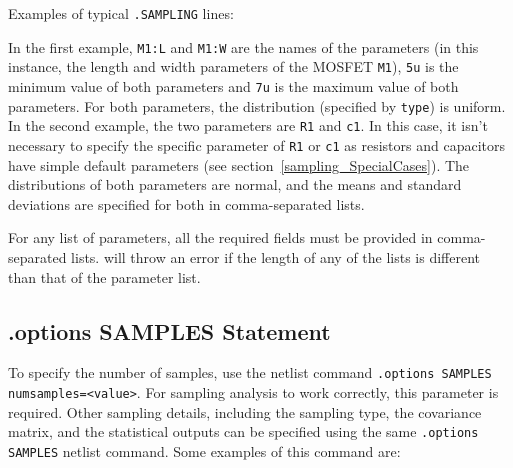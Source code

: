 Examples of typical \verb|.SAMPLING| lines:


In the first example, \verb|M1:L| and \verb|M1:W| 
are the names of the
parameters (in this instance, the length and width parameters of the MOSFET
\texttt{M1}), \verb|5u| is the minimum value of both parameters and
\verb|7u| is the maximum value of both parameters.  For both parameters, 
the distribution (specified by \texttt{type}) is uniform.
In the second example, the two parameters are \verb|R1| and \verb|c1|.   In this 
case, it isn't necessary to specify the specific parameter of \verb|R1| or \verb|c1| 
as resistors and capacitors have simple default parameters (see section~\ref{sampling_SpecialCases}).  
The distributions of both parameters are normal, and the means and standard deviations 
are specified for both in comma-separated lists.

For any list of parameters, all the required fields must be provided in comma-separated 
lists.  \Xyce{} will throw an error if the length of any of the lists is different 
than that of the parameter list.

\subsection{.options SAMPLES Statement}
\label{options_samples_statement}

To specify the number of samples, use the netlist command \texttt{.options 
SAMPLES numsamples=<value>}.   For sampling analysis to work correctly, this parameter is required.
Other sampling details, including the sampling type, the covariance matrix, and 
the statistical outputs can be specified using the 
same \verb|.options SAMPLES| netlist command.  Some examples of this command are:

